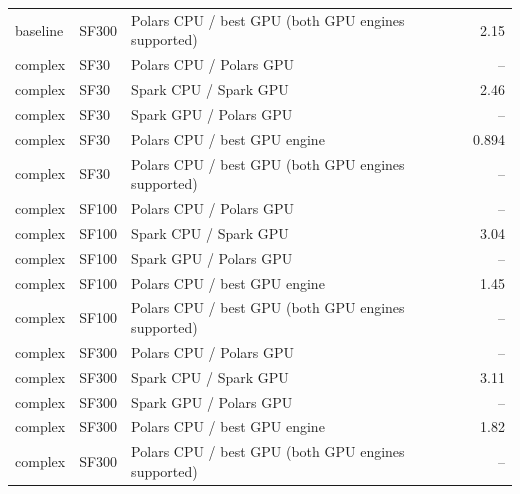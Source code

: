 \begin{tabular}{lllr}
baseline & SF300 & Polars CPU / best GPU (both GPU engines supported) & 2.15 \\
complex & SF30 & Polars CPU / Polars GPU & -- \\
complex & SF30 & Spark CPU / Spark GPU & 2.46 \\
complex & SF30 & Spark GPU / Polars GPU & -- \\
complex & SF30 & Polars CPU / best GPU engine & 0.894 \\
complex & SF30 & Polars CPU / best GPU (both GPU engines supported) & -- \\
complex & SF100 & Polars CPU / Polars GPU & -- \\
complex & SF100 & Spark CPU / Spark GPU & 3.04 \\
complex & SF100 & Spark GPU / Polars GPU & -- \\
complex & SF100 & Polars CPU / best GPU engine & 1.45 \\
complex & SF100 & Polars CPU / best GPU (both GPU engines supported) & -- \\
complex & SF300 & Polars CPU / Polars GPU & -- \\
complex & SF300 & Spark CPU / Spark GPU & 3.11 \\
complex & SF300 & Spark GPU / Polars GPU & -- \\
complex & SF300 & Polars CPU / best GPU engine & 1.82 \\
complex & SF300 & Polars CPU / best GPU (both GPU engines supported) & -- \\
\bottomrule
\end{tabular}
